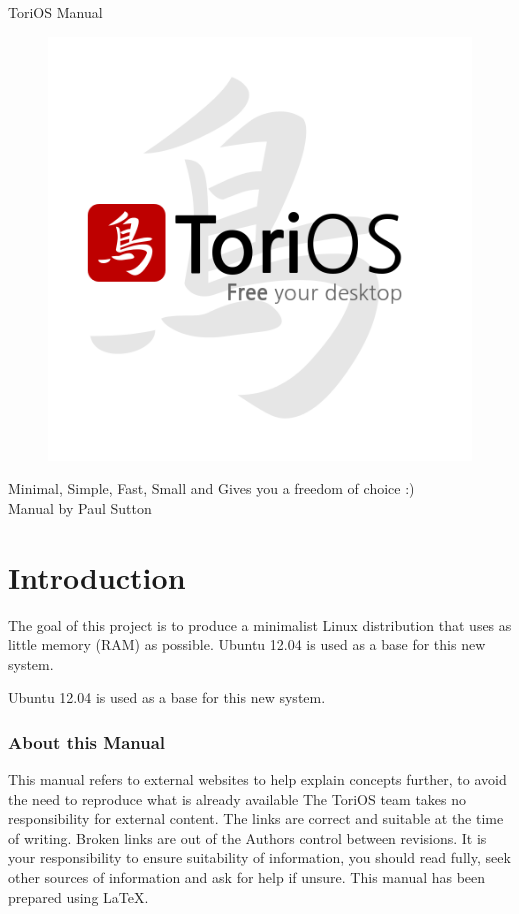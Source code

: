\documentclass[12pt,a4paper]{book}
\author{Paul Sutton}
\begin{document}
\begin{center}
{\Huge ToriOS Manual}
\end{center}



\begin{figure}
\centering
\includegraphics[width=0.7\linewidth]{./FinalLogo}

\end{figure}


\begin{center}
Minimal, Simple, Fast, Small and Gives you a freedom of choice :) \\
Manual by Paul Sutton
\end{center}

\tableofcontents
{}
\chapter{Introduction}
The goal of this project is to produce a minimalist Linux distribution that uses as little memory (RAM) as possible. Ubuntu 12.04 is used as a base for this new system. 



Ubuntu 12.04 is used as a base for this new system.
\subsection{About this Manual}
This manual refers to external websites to help explain concepts further, to avoid the need to reproduce what is already available  The ToriOS team takes no responsibility for external content.  The links are correct and suitable at the time of writing.  Broken links are out of the Authors control between revisions.  It is your responsibility to ensure suitability of information, you should read fully, seek other sources of information and ask for help if unsure.  
This manual has been prepared using \LaTeX.
\end{document}
